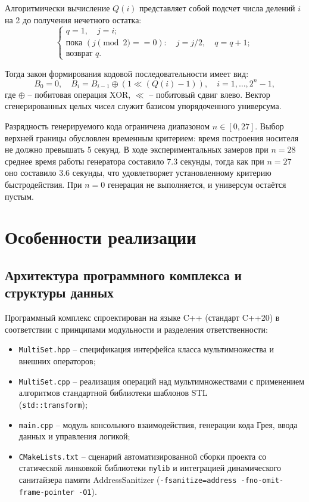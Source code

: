 \documentclass[14pt, a4paper]{extarticle}
\begin{document}
	Алгоритмически вычисление $Q(i)$ представляет собой подсчет числа делений $i$ на 2 до получения нечетного остатка:
	\begin{equation}
		\begin{cases}
			q = 1, \quad j = i; \\
			\text{пока } (j \pmod 2 == 0): \quad j = j / 2, \quad q = q + 1; \\
			\text{возврат } q.
		\end{cases}
	\end{equation}
	
	Тогда закон формирования кодовой последовательности имеет вид:
	\begin{equation}
		B_0 = 0, \quad B_i = B_{i-1} \oplus (1 \ll (Q(i) - 1)), \quad i = 1, \dots, 2^n - 1,
	\end{equation}
	где $\oplus$ -- побитовая операция XOR, $\ll$ -- побитовый сдвиг влево. Вектор сгенерированных целых чисел служит базисом упорядоченного универсума.
	
	Разрядность генерируемого кода ограничена диапазоном $n \in [0, 27]$. Выбор верхней границы обусловлен временным критерием: время построения носителя не должно превышать 5 секунд. В ходе экспериментальных замеров при $n = 28$ среднее время работы генератора составило 7.3 секунды, тогда как при $n = 27$ оно составило 3.6 секунды, что удовлетворяет установленному критерию быстродействия. При $n = 0$ генерация не выполняется, и универсум остаётся пустым.
	
	\newpage
	\newpage
	\section{Особенности реализации}
	
	\subsection{Архитектура программного комплекса и структуры данных}
	
	Программный комплекс спроектирован на языке C++ (стандарт C++20) в соответствии с принципами модульности и разделения ответственности:
	\begin{itemize}
		\item \texttt{MultiSet.hpp} -- спецификация интерфейса класса мультимножества и внешних операторов;
		\item \texttt{MultiSet.cpp} -- реализация операций над мультимножествами с применением алгоритмов стандартной библиотеки шаблонов STL\\ (\texttt{std::transform});
		\item \texttt{main.cpp} -- модуль консольного взаимодействия, генерации кода Грея, ввода данных и управления логикой;
		\item \texttt{CMakeLists.txt} -- сценарий автоматизированной сборки проекта со статической линковкой библиотеки \texttt{mylib} и интеграцией динамического санитайзера памяти AddressSanitizer (\texttt{-fsanitize=address -fno-omit-frame-pointer -O1}).
	\end{itemize}
	
\end{document}
